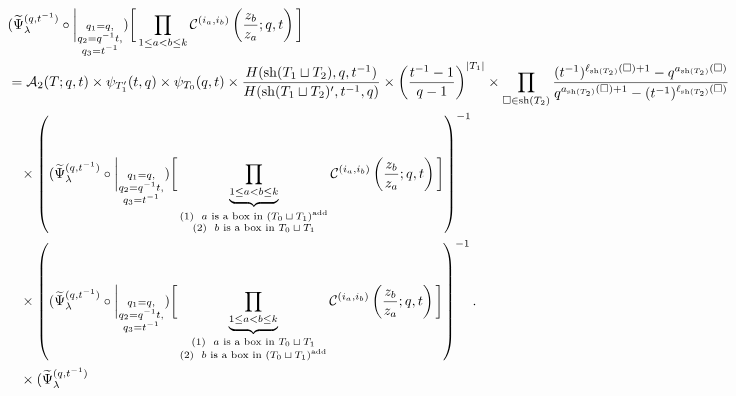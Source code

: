 \documentclass[12pt,reqno,a4paper]{amsart}
\newcommand{\comp}{\circ}
\newcommand{\cals}[1]{\mathcal{#1}}
\numberwithin{equation}{section}
\theoremstyle{definition}
\begin{document}
\footnotesize
\begin{align}
	&(
	\widetilde{\Psi}_{\lambda}^{(q,t^{-1})}
	\comp 
	\bigg|_{
		\substack{
			q_1 = q, \\
			q_2 = q^{-1}t,\\
			q_3 = t^{-1} \\
		}
	}
	)
	\bigg[
	\prod_{1 \leq a < b \leq k}
	\cals{C}^{(i_a,i_b)}\left(
	\frac{z_b}{z_a}
	; q, t
	\right)
	\bigg]
	\\
	&=  
	\cals{A}_2(T;q,t) \times 
	\psi_{T^{\prime}_{1}}(t,q) \times \psi_{T_0}(q,t)
	\times
	\frac{
		H(\operatorname{sh}(T_1 \sqcup T_2),q,t^{-1})
	}{
		H(\operatorname{sh}(T_1 \sqcup T_2)^\prime,t^{-1},q)
	}
	\times
	\left(	\frac{t^{-1} - 1}{q-1}		\right)^{|T_1|}
	\notag
	\times 
	\prod_{\square \in \operatorname{sh}(T_2)}
	\frac{
		(t^{-1})^{\ell_{\operatorname{sh}(T_2)}(\square) + 1} - q^{a_{\operatorname{sh}(T_2)}(\square)}
	}{
		q^{a_{\operatorname{sh}(T_2)}(\square) + 1} - (t^{-1})^{\ell_{\operatorname{sh}(T_2)}(\square)}
	}
	\notag 
	\\
	&\hspace{0.3cm}\times
	\left(
	(
	\widetilde{\Psi}_{\lambda}^{(q,t^{-1})}
	\comp 
	\bigg|_{
		\substack{
			q_1 = q, \\
			q_2 = q^{-1}t,\\
			q_3 = t^{-1} \\
		}
	}
	)
	\bigg[
	\underbrace{	\prod_{1 \leq a < b \leq k}				}_{
		\substack{
			(1) \,\, \text{ $a$ is a box in $(T_0 \sqcup T_1)^{\operatorname{add}}$}
			\\
			(2) \,\, \text{ $b$ is a box in $T_0 \sqcup T_1$}
		}
	}
	\cals{C}^{(i_a,i_b)}\left(
	\frac{z_b}{z_a}
	; q, t
	\right)
	\bigg]
	\right)^{-1}
	\notag 
	\\
	&\hspace{0.3cm}\times
	\left(
	(
	\widetilde{\Psi}_{\lambda}^{(q,t^{-1})}
	\comp 
	\bigg|_{
		\substack{
			q_1 = q, \\
			q_2 = q^{-1}t,\\
			q_3 = t^{-1} \\
		}
	}
	)
	\bigg[
	\underbrace{	\prod_{1 \leq a < b \leq k}				}_{
		\substack{
			(1) \,\, \text{ $a$ is a box in $T_0 \sqcup T_1$}
			\\
			(2) \,\, \text{ $b$ is a box in $(T_0 \sqcup T_1)^{\operatorname{add}}$}
		}
	}
	\cals{C}^{(i_a,i_b)}\left(
	\frac{z_b}{z_a}
	; q, t
	\right)
	\bigg]
	\right)^{-1}.
	\notag
	\\
	&\hspace{0.3cm}\times
	(
	\widetilde{\Psi}_{\lambda}^{(q,t^{-1})}

\end{align}
\end{document}
